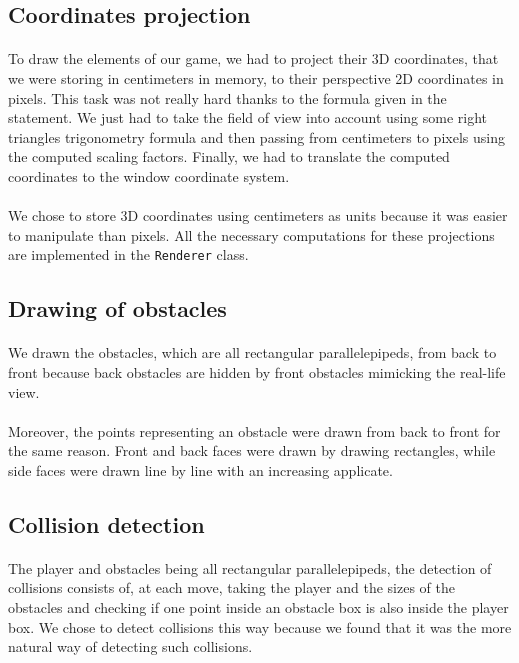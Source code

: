 \documentclass[a4paper, 11pt, oneside]{article}
\begin{document}
\subsection{Coordinates projection}
\paragraph{}To draw the elements of our game, we had to project their 3D coordinates, that we were storing in centimeters in memory, to their perspective 2D coordinates in pixels. This task was not really hard thanks to the formula given in the statement. We just had to take the field of view into account using some right triangles trigonometry formula and then passing from centimeters to pixels using the computed scaling factors. Finally, we had to translate the computed coordinates to the window coordinate system.
\paragraph{}We chose to store 3D coordinates using centimeters as units because it was easier to manipulate than pixels. All the necessary computations for these projections are implemented in the \texttt{Renderer} class. 

\subsection{Drawing of obstacles}
\paragraph{}We drawn the obstacles, which are all rectangular parallelepipeds, from back to front because back obstacles are hidden by front obstacles mimicking the real-life view. 
\paragraph{}Moreover, the points representing an obstacle were drawn from back to front for the same reason. Front and back faces were drawn by drawing rectangles, while side faces were drawn line by line with an increasing applicate.

\subsection{Collision detection}
\paragraph{}The player and obstacles being all rectangular parallelepipeds, the detection of collisions consists of, at each move, taking the player and the sizes of the obstacles and checking if one point inside an obstacle box is also inside the player box. We chose to detect collisions this way because we found that it was the more natural way of detecting such collisions.
\end{document}

